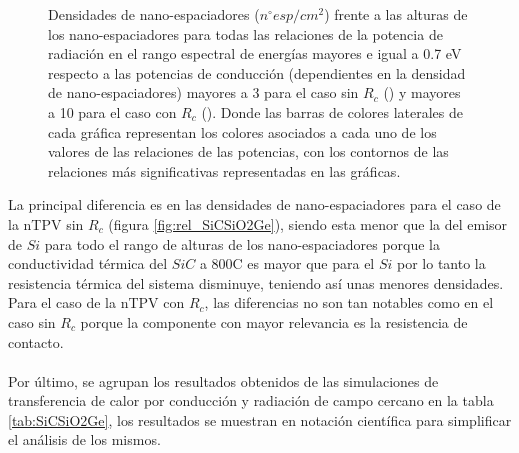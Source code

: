 \begin{figure}[H]
\begin{subfigure}[b]{0.49\textwidth}
		\caption{ }
		\label{fig:rel_SiCSiO2Ge_Rc}
	\end{subfigure}
	\caption{Densidades de nano-espaciadores ($n^{\circ}esp/cm^2$) frente a las alturas de los nano-espaciadores para todas las relaciones de la potencia de radiación en el rango espectral de energías mayores e igual a 0.7 eV respecto a las potencias de conducción (dependientes en la densidad de nano-espaciadores) mayores a 3 para el caso sin $R_c$ () y mayores a 10 para el caso con $R_c$ (). Donde las barras de colores laterales de cada gráfica representan los colores asociados a cada uno de los valores de las relaciones de las potencias, con los contornos de las relaciones más significativas representadas en las gráficas.}
	\label{fig:relation_SiCSiO2Ge}
\end{figure}
La principal diferencia es en las densidades de nano-espaciadores para el caso de la nTPV sin $R_c$ (figura \ref{fig:rel_SiCSiO2Ge}), siendo esta menor que la del emisor de $Si$ para todo el rango de alturas de los nano-espaciadores porque la conductividad térmica del $SiC$ a 800\textdegree C es mayor que para el $Si$ por lo tanto la resistencia térmica del sistema disminuye, teniendo así unas menores densidades. Para el caso de la nTPV con $R_c$, las diferencias no son tan notables como en el caso sin $R_c$ porque la componente con mayor relevancia es la resistencia de contacto.\\\\
Por último, se agrupan los resultados obtenidos de las simulaciones de transferencia de calor por conducción y radiación de campo cercano en la tabla \ref{tab:SiCSiO2Ge}, los resultados se muestran en notación científica para simplificar el análisis de los mismos.
